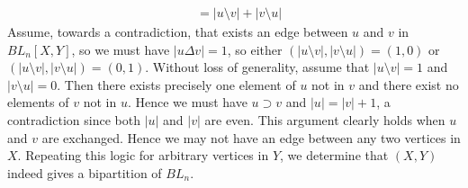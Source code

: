 \begin{ans}
\begin{itemize}
\begin{align*}
							  &= |u \setminus v| + |v \setminus u|
	\end{align*}
	Assume, towards a contradiction, that exists an edge between $u$ and $v$ in $BL_n[X,Y]$, so we must have $|u \Delta v| = 1$, so either $(|u \setminus v|,|v \setminus u|) = (1,0)$ or $(|u \setminus v|,|v \setminus u|) = (0,1)$. Without loss of generality, assume that $|u \setminus v| = 1$ and $|v \setminus u| = 0$. Then there exists precisely one element of $u$ not in $v$ and there exist no elements of $v$ not in $u$. Hence we must have $u \supset v$ and $|u| = |v|+1$, a contradiction since both $|u|$ and $|v|$ are even. This argument clearly holds when $u$ and $v$ are exchanged. Hence we may not have an edge between any two vertices in $X$. Repeating this logic for arbitrary vertices in $Y$, we determine that $(X,Y)$ indeed gives a bipartition of $BL_n$.
\end{itemize}
\end{ans}